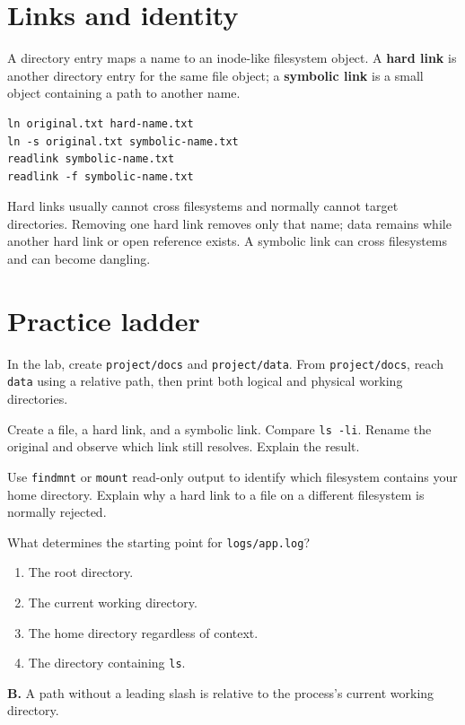 \documentclass[11pt,oneside,openany]{book}
\newcommand{\term}[1]{\textbf{\color{Navy}#1}}
\newcommand{\fourchoices}[4]{%
  \begin{enumerate}[label=\Alph*),leftmargin=2em,itemsep=0.25em]
    \item #1
    \item #2
    \item #3
    \item #4
  \end{enumerate}}
\begin{document}
\section{Links and identity}
A directory entry maps a name to an inode-like filesystem object. A \term{hard link} is another directory entry for the same file object; a \term{symbolic link} is a small object containing a path to another name.
\begin{lstlisting}
ln original.txt hard-name.txt
ln -s original.txt symbolic-name.txt
readlink symbolic-name.txt
readlink -f symbolic-name.txt
\end{lstlisting}
Hard links usually cannot cross filesystems and normally cannot target directories. Removing one hard link removes only that name; data remains while another hard link or open reference exists. A symbolic link can cross filesystems and can become dangling.

\section{Practice ladder}
\begin{practicebox}[title={Easy -- relative routes}]
In the lab, create \texttt{project/docs} and \texttt{project/data}. From \texttt{project/docs}, reach \texttt{data} using a relative path, then print both logical and physical working directories.
\end{practicebox}
\begin{practicebox}[title={Medium -- link experiment}]
Create a file, a hard link, and a symbolic link. Compare \texttt{ls -li}. Rename the original and observe which link still resolves. Explain the result.
\end{practicebox}
\begin{practicebox}[title={Hard -- mount-aware reasoning}]
Use \texttt{findmnt} or \texttt{mount} read-only output to identify which filesystem contains your home directory. Explain why a hard link to a file on a different filesystem is normally rejected.
\end{practicebox}

\begin{questionbox}[title={Medium 5.1 -- Paths}]
What determines the starting point for \texttt{logs/app.log}?
\fourchoices{The root directory.}{The current working directory.}{The home directory regardless of context.}{The directory containing \texttt{ls}.}
\end{questionbox}
\begin{answerbox}
\textbf{B.} A path without a leading slash is relative to the process's current working directory.
\end{answerbox}
\end{document}

